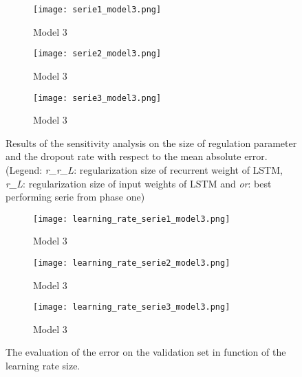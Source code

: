 \begin{figure}[ht]
	\centering
	\begin{subfigure}{0.49\linewidth}
		\texttt{[image: serie1\_model3.png]}
		\caption{Model 3}
	\end{subfigure}	
	\begin{subfigure}{0.49\linewidth}
		\texttt{[image: serie2\_model3.png]}
		\caption{Model 3}
	\end{subfigure}
	\begin{subfigure}{0.5\linewidth}
		\texttt{[image: serie3\_model3.png]}
		\caption{Model 3}
	\end{subfigure}
	\caption{Results of the sensitivity analysis on the size of regulation parameter and the dropout rate with respect to the mean absolute error.(Legend: \textit{r\_r\_L}: regularization size of recurrent weight of LSTM, \textit{r\_L}: regularization size of input weights of LSTM and \textit{or}: best performing serie from phase one)}
	\label{fig:sensitivity_model3}
\end{figure}

\begin{figure}[h]
	\centering
	\begin{subfigure}{0.49\linewidth}
		\texttt{[image: learning\_rate\_serie1\_model3.png]}
		\caption{Model 3}
	\end{subfigure}	
	\begin{subfigure}{0.49\linewidth}
		\texttt{[image: learning\_rate\_serie2\_model3.png]}
		\caption{Model 3}
	\end{subfigure}
	\begin{subfigure}{0.5\linewidth}
		\texttt{[image: learning\_rate\_serie3\_model3.png]}
		\caption{Model 3}
	\end{subfigure}
	\caption{The evaluation of the error on the validation set in function of the learning rate size.}
	\label{fig:learning_rate_model3}
\end{figure}





